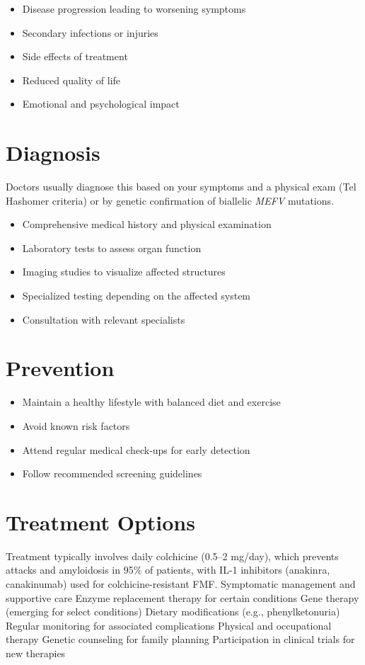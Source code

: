 \begin{itemize}[noitemsep]
  \item Disease progression leading to worsening symptoms
  \item Secondary infections or injuries
  \item Side effects of treatment
  \item Reduced quality of life
  \item Emotional and psychological impact
\end{itemize}
\section{Diagnosis}
Doctors usually diagnose this based on your symptoms and a physical exam (Tel Hashomer criteria) or by genetic confirmation of biallelic \textit{MEFV} mutations.

\begin{itemize}[noitemsep]
  \item Comprehensive medical history and physical examination
  \item Laboratory tests to assess organ function
  \item Imaging studies to visualize affected structures
  \item Specialized testing depending on the affected system
  \item Consultation with relevant specialists
\end{itemize}
\section{Prevention}
\begin{itemize}[noitemsep]
  \item Maintain a healthy lifestyle with balanced diet and exercise
  \item Avoid known risk factors
  \item Attend regular medical check-ups for early detection
  \item Follow recommended screening guidelines
\end{itemize}
\section{Treatment Options}
Treatment typically involves daily colchicine (0.5--2 mg/day), which prevents attacks and amyloidosis in 95\% of patients, with IL-1 inhibitors (anakinra, canakinumab) used for colchicine-resistant FMF. Symptomatic management and supportive care Enzyme replacement therapy for certain conditions Gene therapy (emerging for select conditions) Dietary modifications (e.g., phenylketonuria) Regular monitoring for associated complications Physical and occupational therapy Genetic counseling for family planning Participation in clinical trials for new therapies

